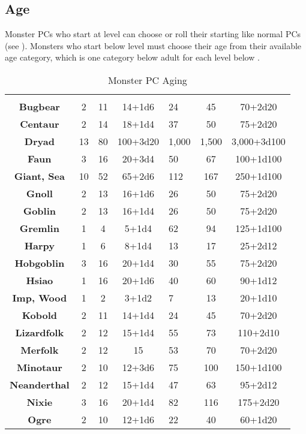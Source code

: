 \begin{multicols*}{2}
\subsection{Age}
Monster PCs who start at  level can choose or roll their starting like normal PCs (see ). Monsters who start below  level must choose their age from their available age category, which is one category below adult for each level below .

\begin {table}[H]
  \caption{Monster PC Aging}\label{tab:Monster PC Aging}
	\scriptsize
  \begin{tabularx}{\columnwidth}{>{\bfseries}ccccYcc}
	 &  & \tiny{} &  & \tiny{} &  & \\
	Bugbear & 2 & 11 & 14+1d6 & 24 & 45 & 70+2d20\\
	Centaur & 2 & 14 & 18+1d4 & 37 & 50 & 75+2d20\\
	Dryad & 13 & 80 & 100+3d20 & 1,000 & 1,500 & 3,000+3d100\\
	Faun & 3 & 16 & 20+3d4 & 50 & 67 & 100+1d100\\
	Giant, Sea & 10 & 52 & 65+2d6 & 112 & 167 & 250+1d100\\
	Gnoll & 2 & 13 & 16+1d6 & 26 & 50 & 75+2d20\\
	Goblin & 2 & 13 & 16+1d4 & 26 & 50 & 75+2d20\\
	Gremlin & 1 & 4 & 5+1d4 & 62 & 94 & 125+1d100\\
	Harpy & 1 & 6 & 8+1d4 & 13 & 17 & 25+2d12\\
	Hobgoblin & 3 & 16 & 20+1d4 & 30 & 55 & 75+2d20\\
	Hsiao & 1 & 16 & 20+1d6 & 40 & 60 & 90+1d12\\
	Imp, Wood & 1 & 2 & 3+1d2 & 7 & 13 & 20+1d10\\
	Kobold & 2 & 11 & 14+1d4 & 24 & 45 & 70+2d20\\
	Lizardfolk & 2 & 12 & 15+1d4 & 55 & 73 & 110+2d10\\
	Merfolk & 2 & 12 & 15 & 53 & 70 & 70+2d20\\
	Minotaur & 2 & 10 & 12+3d6 & 75 & 100 & 150+1d100\\
	Neanderthal & 2 & 12 & 15+1d4 & 47 & 63 & 95+2d12\\
	Nixie & 3 & 16 & 20+1d4 & 82 & 116 & 175+2d20\\
	Ogre & 2 & 10 & 12+1d6 & 22 & 40 & 60+1d20\\

\end{tabularx}
\end{table}
\end{multicols*}
